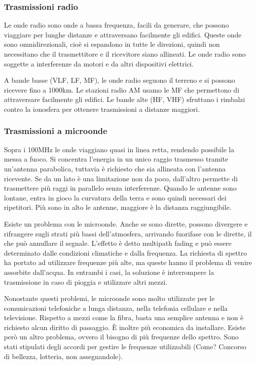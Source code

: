 \subsubsection{Trasmissioni radio}
Le onde radio sono onde a bassa frequenza, facili da generare, che possono viaggiare per lunghe distanze e attraversano facilmente gli edifici. 
Queste onde sono omnidirezionali, cioè si espandono in tutte le direzioni, quindi non necessitano che il trasmettitore e il ricevitore siano allineati.
Le onde radio sono soggette a interferenze da motori e da altri dispositivi elettrici.

A bande basse (VLF, LF, MF), le onde radio seguono il terreno e si possono ricevere fino a 1000km.
Le stazioni radio AM usamo le MF che permettono di attraversare facilmente gli edifici.
Le bande alte (HF, VHF) sfruttano i rimbalzi contro la ionosfera per ottenere trasmissioni a distanze maggiori.

\subsubsection{Trasmissioni a microonde}
Sopra i 100MHz le onde viaggiano quasi in linea retta, rendendo possibile la messa a fuoco.
Si concentra l'energia in un unico raggio trasmesso tramite un'antenna parabolica, tuttavia è richiesto che sia allineata con l'antenna ricevente.
Se da un lato è una limitazione non da poco, dall'altro permette di trasmettere più raggi in parallelo senza interferenze.
Quando le antenne sono lontane, entra in gioco la curvatura della terra e sono quindi necessari dei ripetitori.
Più sono in alto le antenne, maggiore è la distanza raggiungibile.

Esiste un problema con le microonde. Anche se sono dirette, possono divergere e rifrangere sugli strati più bassi dell'atmosfera,
arrivando fuorifase con le dirette, il che può annullare il segnale.
L'effetto è detto multipath fading e può essere determinato dalle condizioni climatiche e dalla frequenza.
La richiesta di spettro ha portato ad utilizzare frequenze più alte, ma queste hanno il problema di venire assorbite dall'acqua. 
In entrambi i casi, la soluzione è interrompere la trasmissione in caso di pioggia e utilizzare altri mezzi.

Nonostante questi problemi, le microonde sono molto utilizzate per le comunicazioni telefoniche a lunga distanza, nella telefonia cellulare e nella televisione.
Rispetto a mezzi come la fibra, basta una semplice antenna e non è richiesto alcun diritto di passaggio. 
\`E inoltre più economica da installare.
Esiste però un altro problema, ovvero il bisogno di più frequenze dello spettro.
Sono stati stipulati degli accordi per gestire le frequenze utilizzabili (Come? Concorso di bellezza, lotteria, non assegnandole). 

